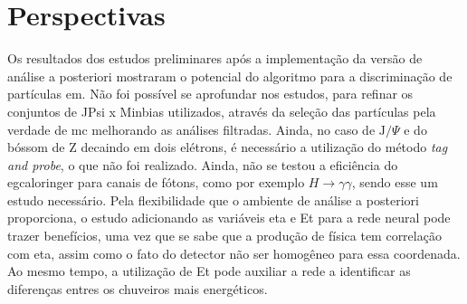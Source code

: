   
\section{Perspectivas}

Os resultados dos estudos preliminares após a implementação da versão de análise
a posteriori mostraram o potencial do algoritmo para a discriminação de
partículas \gls{em}. Não foi possível se aprofundar nos estudos, para refinar os
conjuntos de JPsi x Minbias utilizados, através da seleção das partículas pela
verdade de \gls{mc} melhorando as análises filtradas. Ainda, no caso de
$\text{J}/\Psi$ e do bóssom de Z decaindo em dois elétrons, é necessário a
utilização do método \emph{tag and probe}, o que não foi realizado.
Ainda, não se testou a eficiência do \gls{egcaloringer} para canais de fótons,
como por exemplo $H\rightarrow\gamma\gamma$, sendo esse um estudo necessário.
Pela flexibilidade que o ambiente de análise a posteriori proporciona, o estudo
adicionando as variáveis \gls{eta} e \gls{Et} para a rede neural pode trazer
benefícios, uma vez que se sabe que a produção de física tem correlação com
\gls{eta}, assim como o fato do detector não ser homogêneo para essa coordenada.
Ao mesmo tempo, a utilização de \gls{Et} pode auxiliar a rede a identificar as
diferenças entres os chuveiros mais energéticos.



